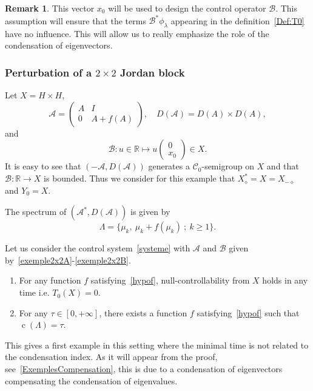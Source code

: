 \documentclass[10pt]{amsart}
\theoremstyle{definition}\newtheorem{defi}[theo]{Definition}\newtheorem{rema}[theo]{Remark}\newtheorem{exam}[theo]{Example}\newtheorem{exem}[theo]{Example}\newtheorem{nota}[theo]{Notation}
\newcommand\A{\mathcal{A}}
\newcommand\As{\mathcal{A}^*}
\newcommand\B{\mathcal{B}}
\newcommand{\DA}{D(\A)}
\newcommand{\Xalphas}{X_\diamond^*}
\newcommand{\Xmalpha}{X_{-\diamond}}
\newcommand{\Fzp}{Y_0}
\newcommand{\R}{\mathbb{R}}
\DeclareMathOperator{\cond}{c}
\newcommand*{\romanenumi}{\renewcommand*{\theenumi}{\roman{enumi}}}
\begin{document}
\begin{rema}
This vector $x_0$ will be used to design the control operator $\B$. This assumption will ensure that the terms $\B^* \phi_\lambda$ appearing in the definition~\eqref{Def:T0} have no influence. This will allow us to really emphasize the role of the condensation of eigenvectors.
\end{rema}

\subsubsection{Perturbation of a \texorpdfstring{$2 \times 2$}{2x2} Jordan block}\label{secexample2x2}

Let $X=H \times H$,
\begin{equation}\label{exemple2x2A}
\A=
\begin{pmatrix} A & I \\ 0 & A+f(A)
\end{pmatrix},
\quad
\DA=D(A)\times D(A),
\end{equation}
and
\begin{equation}\label{exemple2x2B}
\B : u \in \R \mapsto u
\begin{pmatrix} 0\\ x_0
\end{pmatrix} \in X.
\end{equation}
It is easy to see that $(-\A,\DA)$ generates a $\mathcal C_0$-semigroup on $X$ and that $\B:\R\to X$ is bounded. Thus we consider for this example that $\Xalphas = X = \Xmalpha$ and $\Fzp=X$.

The spectrum of $(\As, \DA)$ is given by
\[
\Lambda = \{ \mu_k, \: \mu_k+f(\mu_k) \: ; \: k \geq 1\}.
\]

\begin{prop}\label{Prop:Academique1}
Let us consider the control system~\eqref{systeme} with $\A$ and $\B$ given by~\eqref{exemple2x2A}-\eqref{exemple2x2B}.
\begin{enumerate}\romanenumi
\item \label{prop5.2.1} For any function $f$ satisfying~\eqref{hypof}, null-controllability from $X$ holds in any time i.e. $T_0(X)=0$.
\smallskip
\item \label{prop5.2.2}For any $\tau \in [0,+\infty]$, there exists a function $f$ satisfying~\eqref{hypof} such that $\cond(\Lambda)= \tau$.
\end{enumerate}
\end{prop}

This gives a first example in this setting where the minimal time is not related to the condensation index. As it will appear from the proof, see~\eqref{ExemplesCompensation}, this is due to a condensation of eigenvectors compensating the condensation of eigenvalues.
\end{document}
